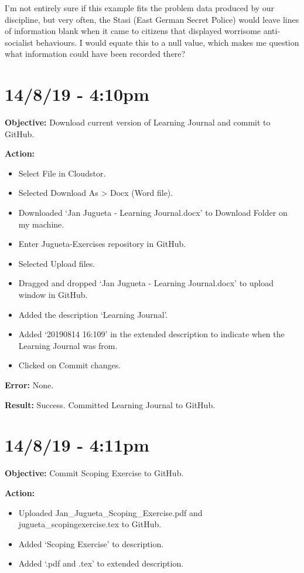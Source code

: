 \documentclass{article}
\begin{document}
I’m not entirely sure if this example fits the problem data produced by our discipline, but very often, the Stasi (East German Secret Police) would leave lines of information blank when it came to citizens that displayed worrisome anti-socialist behaviours. I would equate this to a null value, which makes me question what information could have been recorded there?

\section*{14/8/19 - 4:10pm}

\textbf{Objective:} Download current version of Learning Journal and commit to GitHub.

\textbf{Action:}
\begin{itemize}
    \item Select File in Cloudstor.
    \item Selected Download As > Docx (Word file).
    \item Downloaded ‘Jan Jugueta - Learning Journal.docx’ to Download Folder on my machine.
    \item Enter Jugueta-Exercises repository in GitHub.
    \item Selected Upload files.
    \item Dragged and dropped ‘Jan Jugueta - Learning Journal.docx’ to upload window in GitHub.
    \item Added the description ‘Learning Journal’.
    \item Added ‘20190814 16:109’ in the extended description to indicate when the Learning Journal was from.
    \item Clicked on Commit changes.
\end{itemize}

\textbf{Error:} None.

\textbf{Result:} Success. Committed Learning Journal to GitHub.

\section*{14/8/19 - 4:11pm}

\textbf{Objective:} Commit Scoping Exercise to GitHub.

\textbf{Action:}
\begin{itemize}
    \item Uploaded Jan\_Jugueta\_Scoping\_Exercise.pdf and jugueta\_scopingexercise.tex to GitHub.
    \item Added ‘Scoping Exercise’ to description.
    \item Added ‘.pdf and .tex’ to extended description.
\end{itemize}
\end{document}
